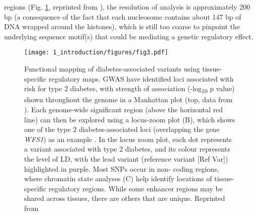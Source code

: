 regions (Fig. \ref{fig:ci_f3}, reprinted from \cite{kyonoGenomicAnnotationDiseaseassociated2019}), the resolution of analysis is approximately 200 bp (a consequence of the fact that each nucleosome contains about 147 bp of DNA wrapped around the histones), which is still too coarse to pinpoint the underlying sequence motif(s) that could be mediating a genetic regulatory effect. 


\begin{figure}
        \centering
        \texttt{[image: 1\_introduction/figures/fig3.pdf]}
        \caption{Functional mapping of diabetes-associated variants using tissue-specific regulatory maps. GWAS have identified loci associated with risk for type 2 diabetes, with strength of association (-log\textsubscript{10} p value) shown throughout the genome in a Manhattan plot (top, data from \cite{thediabetesgeneticsreplicationandmeta-analysisdiagramconsortiumLargescaleAssociationAnalysis2012,t2dknowledgeportalTypeDiabetesKnowledge2019}). Each genome-wide significant region (above the horizontal red line) can then be explored using a locus-zoom plot (B), which shows one of the type 2 diabetes-associated loci (overlapping the gene \textit{WFS1}) as an example \cite{t2dknowledgeportalTypeDiabetesKnowledge2019}. In the locus zoom plot, each dot represents a variant associated with type 2 diabetes, and its colour represents the level of LD, with the lead variant (reference variant [Ref Var]) highlighted in purple. Most SNPs occur in non- coding regions, where chromatin state analyses (C) help identify locations of tissue-specific regulatory regions. While some enhancer regions may be shared across tissues, there are others that are unique. Reprinted from \cite{kyonoGenomicAnnotationDiseaseassociated2019}}
        \label{fig:ci_f3}
\end{figure}


